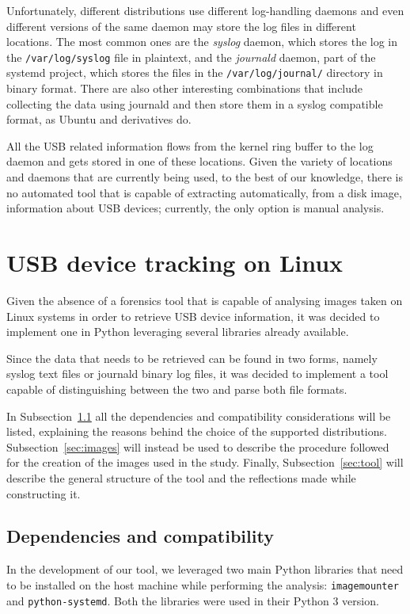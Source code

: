 \documentclass[a4paper]{article}
\begin{document}
Unfortunately, different distributions use different log-handling daemons and
even different versions of the same daemon may store the log files in
different locations. The most common ones are the \emph{syslog} daemon, which
stores the log in the \texttt{/var/log/syslog} file in plaintext, and the
\emph{journald} daemon, part of the systemd project, which stores the files in
the \texttt{/var/log/journal/} directory in binary format. There are also other
interesting combinations that include collecting the data using journald and
then store them in a syslog compatible format, as Ubuntu and derivatives
do.~\cite{poettering2012journal}

All the USB related information flows from the kernel ring buffer to the log
daemon and gets stored in one of these locations. Given the variety of locations
and daemons that are currently being used, to the best of our knowledge, there
is no automated tool that is capable of extracting automatically, from a disk
image, information about USB devices; currently, the only option is manual
analysis.

\section{USB device tracking on Linux}
\label{sec:contrib}
Given the absence of a forensics tool that is capable of analysing images taken
on Linux systems in order to retrieve USB device information, it was decided to
implement one in Python leveraging several libraries already available.

Since the data that needs to be retrieved can be found in two forms, namely
syslog text files or journald binary log files, it was decided to implement a
tool capable of distinguishing between the two and parse both file formats.

In Subsection~\ref{sec:prems} all the dependencies and compatibility
considerations will be listed, explaining the reasons behind the choice of the
supported distributions. Subsection~\ref{sec:images} will instead be used to
describe the procedure followed for the creation of the images used in the
study. Finally, Subsection~\ref{sec:tool} will describe the general structure of
the tool and the reflections made while constructing it.

\subsection{Dependencies and compatibility}
\label{sec:prems}
In the development of our tool, we leveraged two main Python libraries that need
to be installed on the host machine while performing the analysis:
\texttt{imagemounter} and \texttt{python-systemd}. Both the libraries were used
in their Python 3 version.
\end{document}
